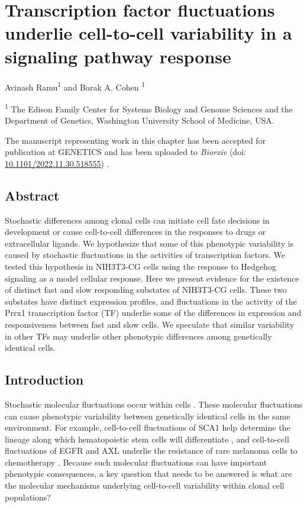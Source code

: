 \chapter{Transcription factor fluctuations underlie cell-to-cell variability in a signaling pathway response}
\label{chap:hedgehog}
\vspace{0.2in}

Avinash Ramu\textsuperscript{1} and Barak A. Cohen \textsuperscript{1}

\vspace{0.2in}

\textsuperscript{1} The Edison Family Center for Systems Biology and Genome Sciences and the Department of Genetics, Washington University School of Medicine, USA. 

\vspace{2in}

The manuscript representing work in this chapter has been accepted for publication at GENETICS and has been uploaded to \textit{Biorxiv} (doi: \href{https://www.biorxiv.org/content/10.1101/2022.11.30.518555v1}{10.1101/2022.11.30.518555}) \cite{ramu2022}.

\newpage

\section{Abstract}
Stochastic differences among clonal cells can initiate cell fate decisions in development or cause cell-to-cell differences in the responses to drugs or extracellular ligands. We hypothesize that some of this phenotypic variability is caused by stochastic fluctuations in the activities of transcription factors. We tested this hypothesis in NIH3T3-CG cells using the response to Hedgehog signaling as a model cellular response. Here we present evidence for the existence of distinct fast and slow responding substates of NIH3T3-CG cells. These two substates have distinct expression profiles, and fluctuations in the activity of the Prrx1 transcription factor (TF) underlie some of the differences in expression and responsiveness between fast and slow cells. We speculate that similar variability in other TFs may underlie other phenotypic differences among genetically identical cells.

\section{Introduction}
Stochastic molecular fluctuations occur within cells \cite{Raser2004-pb,McAdams1997-zq}\cite{Ozbudak2002-dx,Elowitz2002-wn,Raj2006-oo}\cite{Blake2003-yd}. These molecular fluctuations can cause phenotypic variability between genetically identical cells in the same environment. For example, cell-to-cell fluctuations of SCA1 help determine the lineage along which hematopoietic stem cells will differentiate \cite{Chang2008-kv}, and cell-to-cell fluctuations of EGFR and AXL underlie the resistance of rare melanoma cells to chemotherapy \cite{Shaffer2017-ql,Shaffer2018-zl}. Because such molecular fluctuations can have important phenotypic consequences, a key question that needs to be answered is what are the molecular mechanisms underlying cell-to-cell variability within clonal cell populations?

